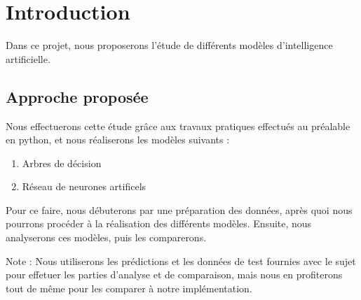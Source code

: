 \chapter{Introduction}

Dans ce projet, nous proposerons l'étude de différents modèles d'intelligence artificielle.

\section*{\color{black}Approche proposée}

Nous effectuerons cette étude grâce aux travaux pratiques effectués au préalable en python, et nous réaliserons les modèles suivants :
\begin{enumerate}
\item Arbres de décision
\item Réseau de neurones artificels
\end{enumerate}

Pour ce faire, nous débuterons par une préparation des données, après quoi nous pourrons procéder à la réalisation des différents modèles. Ensuite, nous analyserons ces modèles, puis les comparerons.

Note : Nous utiliserons les prédictions et les données de test fournies avec le sujet pour effetuer les parties d'analyse et de comparaison, mais nous en profiterons tout de même pour les comparer à notre implémentation.